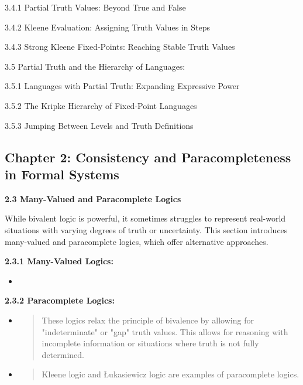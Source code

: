 3.4.1 Partial Truth Values: Beyond True and False

3.4.2 Kleene Evaluation: Assigning Truth Values in Steps

3.4.3 Strong Kleene Fixed-Points: Reaching Stable Truth Values

3.5 Partial Truth and the Hierarchy of Languages:

3.5.1 Languages with Partial Truth: Expanding Expressive Power

3.5.2 The Kripke Hierarchy of Fixed-Point Languages

3.5.3 Jumping Between Levels and Truth Definitions

\hypertarget{chapter-2-consistency-and-paracompleteness-in-formal-systems}{%
\subsection*{Chapter 2: Consistency and Paracompleteness in Formal
Systems}\label{chapter-2-consistency-and-paracompleteness-in-formal-systems}}

\textbf{2.3 Many-Valued and Paracomplete Logics}

While bivalent logic is powerful, it sometimes struggles to represent
real-world situations with varying degrees of truth or uncertainty. This
section introduces many-valued and paracomplete logics, which offer
alternative approaches.

\textbf{2.3.1 Many-Valued Logics:}

\begin{itemize}
\tightlist
\item
\end{itemize}

\textbf{2.3.2 Paracomplete Logics:}

\begin{itemize}
\item
  \begin{quote}
  These logics relax the principle of bivalence by allowing for
  "indeterminate" or "gap" truth values. This allows for reasoning with
  incomplete information or situations where truth is not fully
  determined.
  \end{quote}
\item
  \begin{quote}
  Kleene logic and Łukasiewicz logic are examples of paracomplete
  logics.
  \end{quote}
\end{itemize}


